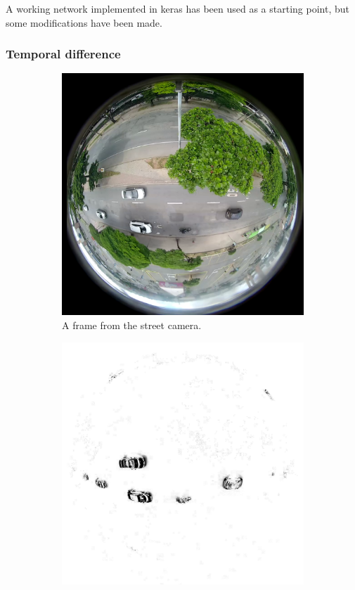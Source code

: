 \documentclass[a4paper,12pt,titlepage]{article}
\numberwithin{figure}{section}
\begin{document}
A working network implemented in keras\cite{ssd_keras} has been used as a starting point, but some modifications have been made. 

\subsubsection{Temporal difference}

\begin{figure}
    \begin{subfigure}[Sample1]{0.5\linewidth}
    	\includegraphics[width=0.95\linewidth]{fig/stream_frame.png} 
        \caption{A frame from the street camera.}
        \label{fig:td_frame}
    \end{subfigure}
    \quad
    \begin{subfigure}[Sample1]{0.5\linewidth} 
    	\includegraphics[width=0.95\linewidth]{fig/stream_black.png}

\end{subfigure}
\end{figure}
\end{document}
